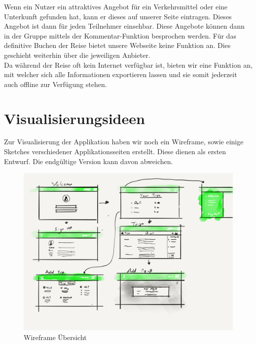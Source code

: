 \documentclass[10pt,a4paper,titlepage,twoside,german,final]{zhawreprt}
\numberwithin{table}{chapter}
\begin{document}
Wenn ein Nutzer ein attraktives Angebot für ein Verkehrsmittel oder eine Unterkunft gefunden hat, kann er dieses auf unserer Seite eintragen. Dieses Angebot ist dann für jeden Teilnehmer einsehbar. Diese Angebote können dann in der Gruppe mittels der Kommentar-Funktion besprochen werden. Für das definitive Buchen der Reise bietet unsere Webseite keine Funktion an. Dies geschieht weiterhin über die jeweiligen Anbieter.\\
Da während der Reise oft kein Internet verfügbar ist, bieten wir eine Funktion an, mit welcher sich alle Informationen exportieren lassen und sie somit jederzeit auch offline zur Verfügung stehen.

\newpage
\section{Visualisierungsideen}\label{sec:Visualisierungsideen}
Zur Visualisierung der Applikation haben wir noch ein Wireframe, sowie einige Sketches verschiedener Applikationsseiten erstellt. Diese dienen  als ersten Entwurf. Die endgültige Version kann davon abweichen.
\begin{figure}[ht!]
  \includegraphics[width=\linewidth]{images/wireframe.png}
  \caption{Wireframe Übersicht}
  \label{fig:TripPodLogo2}
\end{figure}
\end{document}
